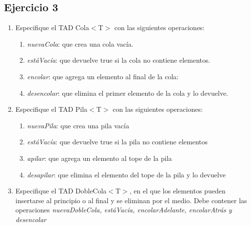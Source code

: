 \subsection{Ejercicio 3}

\begin{enumerate}
	\item Especifique el TAD Cola$<$T$>$ con las siguientes operaciones:

	      \begin{enumerate}[label=\alph*)]
		      \item \textit{nuevaCola}: que crea una cola vacía.
		      \item \textit{estáVacía}: que devuelve true si la cola no contiene elementos.
		      \item \textit{encolar}: que agrega un elemento al final de la cola:
		      \item \textit{desencolar}: que elimina el primer elemento de la cola y lo devuelve.
	      \end{enumerate}

	\item Especifique el TAD Pila$<$T$>$ con las siguientes operaciones:

	      \begin{enumerate}[label=\alph*)]
		      \item \textit{nuevaPila}: que crea una pila vacía
		      \item \textit{estáVacía}: que devuelve true si la pila no contiene elementos
		      \item \textit{apilar}: que agrega un elemento al tope de la pila
		      \item \textit{desapilar}: que elimina el elemento del tope de la pila y lo devuelve
	      \end{enumerate}

	\item Especifique el TAD DobleCola$<$T$>$, en el que los elementos pueden insertarse al principio o al final y se eliminan por el medio. Debe contener las operaciones \textit{nuevaDobleCola, estáVacía, encolarAdelante, encolarAtrás \textnormal{y} desencolar}
\end{enumerate}

